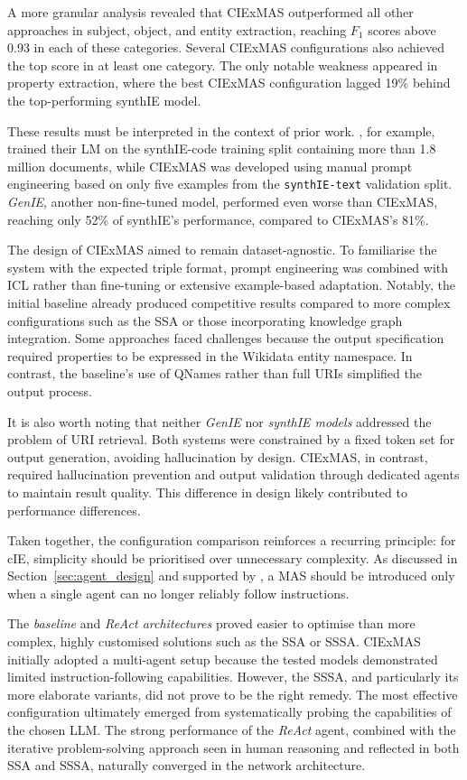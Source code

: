 \documentclass[a4paper,oneside,bibliography=totoc]{scrbook}
\begin{document}
A more granular analysis revealed that CIExMAS outperformed all other approaches in subject, object, and entity extraction, reaching $F_{1}$ scores above 0.93 in each of these categories. Several CIExMAS configurations also achieved the top score in at least one category. The only notable weakness appeared in property extraction, where the best CIExMAS configuration lagged 19\% behind the top-performing synthIE model.

These results must be interpreted in the context of prior work. \citet{Josifoski2023}, for example, trained their \ac{LM} on the synthIE-code training split containing more than 1.8 million documents, while CIExMAS was developed using manual prompt engineering based on only five examples from the \texttt{synthIE-text} validation split. \textit{GenIE}, another non-fine-tuned model, performed even worse than CIExMAS, reaching only 52\% of synthIE’s performance, compared to CIExMAS’s 81\%.

The design of CIExMAS aimed to remain dataset-agnostic. To familiarise the system with the expected triple format, prompt engineering was combined with \ac{ICL} rather than fine-tuning or extensive example-based adaptation. Notably, the initial baseline already produced competitive results compared to more complex configurations such as the \ac{SSA} or those incorporating knowledge graph integration. Some approaches faced challenges because the output specification required properties to be expressed in the Wikidata entity namespace. In contrast, the baseline’s use of QNames rather than full URIs simplified the output process.

It is also worth noting that neither \textit{GenIE} nor \textit{synthIE models} addressed the problem of URI retrieval. Both systems were constrained by a fixed token set for output generation, avoiding hallucination by design. CIExMAS, in contrast, required hallucination prevention and output validation through dedicated agents to maintain result quality. This difference in design likely contributed to performance differences.

Taken together, the configuration comparison reinforces a recurring principle: for \ac{cIE}, simplicity should be prioritised over unnecessary complexity. As discussed in Section~\ref{sec:agent_design} and supported by \citet{Anthropic2024}, a \ac{MAS} should be introduced only when a single agent can no longer reliably follow instructions.

The \textit{baseline} and \textit{ReAct architectures} proved easier to optimise than more complex, highly customised solutions such as the \ac{SSA} or \ac{SSSA}. CIExMAS initially adopted a multi-agent setup because the tested models demonstrated limited instruction-following capabilities. However, the \ac{SSSA}, and particularly its more elaborate variants, did not prove to be the right remedy. The most effective configuration ultimately emerged from systematically probing the capabilities of the chosen \ac{LLM}. The strong performance of the \textit{ReAct} agent, combined with the iterative problem-solving approach seen in human reasoning and reflected in both \ac{SSA} and \ac{SSSA}, naturally converged in the network architecture.
\end{document}
